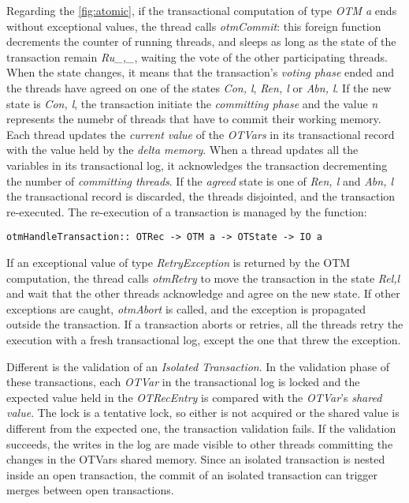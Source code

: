 Regarding the \cref{fig:atomic}, if the transactional computation of type \emph{OTM a} ends without exceptional values, the thread calls \emph{otmCommit}: this foreign function decrements the counter of running threads, and sleeps as long as the state of the transaction remain \emph{Ru\textlangle \_,\_\textrangle}, waiting the vote of the other participating threads.
When the state changes, it means that the transaction's \emph{voting phase} ended and the threads have agreed on one of the states \emph{Co\textlangle n, l\textrangle}, \emph{Re\textlangle n, l\textrangle} or \emph{Ab\textlangle n, l\textrangle}.
If the new state is \emph{Co\textlangle n, l\textrangle}, the transaction initiate the \emph{committing phase} and the value \emph{n} represents the numebr of threads that have to commit their working memory.
Each thread updates the \emph{current value} of the \emph{OTVars} in its transactional record with the value held by the \emph{delta memory}. When a thread updates all the variables in its transactional log, it acknowledges the transaction decrementing the number of \emph{committing threads}.
If the \emph{agreed} state is one of \emph{Re\textlangle n, l\textrangle} and \emph{Ab\textlangle n, l\textrangle} the transactional record is discarded, the threads disjointed, and the transaction re-executed. The re-execution of a transaction is managed by the function:
\begin{lstlisting}
otmHandleTransaction:: OTRec -> OTM a -> OTState -> IO a
\end{lstlisting}

If an exceptional value of type \emph{RetryException} is returned by the OTM computation, the thread calls \emph{otmRetry} to move the transaction in the state \emph{Re\textlangle l,l\textrangle} and wait that the other threads acknowledge and agree on the new state. If other exceptions are caught, \emph{otmAbort} is called, and the exception is propagated outside the transaction. If a transaction aborts or retries, all the threads retry the execution with a fresh transactional log, except the one that threw the exception.


Different is the validation of an \emph{Isolated Transaction}.
In the validation phase of these transactions, each \emph{OTVar} in the transactional log is locked and the expected value held in the \emph{OTRecEntry} is compared with the \emph{OTVar}'s \emph{shared value}.
The lock is a tentative lock, so either is not acquired or the shared value is different from the expected one, the transaction validation fails.
If the validation succeeds, the writes in the log are made visible to other threads committing the changes in the OTVars shared memory. Since an isolated transaction is nested inside an open transaction, the commit of an isolated transaction can trigger merges between open transactions.

